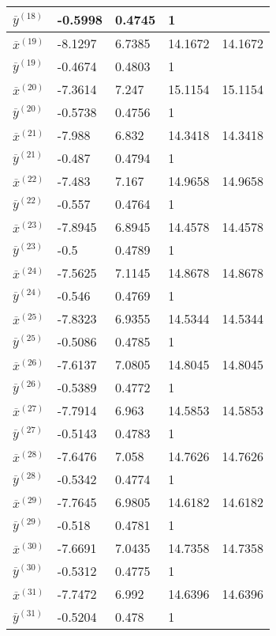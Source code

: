 \documentclass[10pt, a4paper]{scrartcl}
\begin{document}
\begin{center}
\begin{tabular}{ | l  | l  | l  | l  | l |}
$\overline{y}^{(18)}$ & -0.5998 & 0.4745 & 1 &   \\ \hline
$\overline{x}^{(19)}$ & -8.1297 & 6.7385 & 14.1672 & 14.1672 \\ \hline
$\overline{y}^{(19)}$ & -0.4674 & 0.4803 & 1 &   \\ \hline
$\overline{x}^{(20)}$ & -7.3614 & 7.247 & 15.1154 & 15.1154 \\ \hline
$\overline{y}^{(20)}$ & -0.5738 & 0.4756 & 1 &   \\ \hline
$\overline{x}^{(21)}$ & -7.988 & 6.832 & 14.3418 & 14.3418 \\ \hline
$\overline{y}^{(21)}$ & -0.487 & 0.4794 & 1 &   \\ \hline
$\overline{x}^{(22)}$ & -7.483 & 7.167 & 14.9658 & 14.9658 \\ \hline
$\overline{y}^{(22)}$ & -0.557 & 0.4764 & 1 &   \\ \hline
$\overline{x}^{(23)}$ & -7.8945 & 6.8945 & 14.4578 & 14.4578 \\ \hline
$\overline{y}^{(23)}$ & -0.5 & 0.4789 & 1 &   \\ \hline
$\overline{x}^{(24)}$ & -7.5625 & 7.1145 & 14.8678 & 14.8678 \\ \hline
$\overline{y}^{(24)}$ & -0.546 & 0.4769 & 1 &   \\ \hline
$\overline{x}^{(25)}$ & -7.8323 & 6.9355 & 14.5344 & 14.5344 \\ \hline
$\overline{y}^{(25)}$ & -0.5086 & 0.4785 & 1 &   \\ \hline
$\overline{x}^{(26)}$ & -7.6137 & 7.0805 & 14.8045 & 14.8045 \\ \hline
$\overline{y}^{(26)}$ & -0.5389 & 0.4772 & 1 &   \\ \hline
$\overline{x}^{(27)}$ & -7.7914 & 6.963 & 14.5853 & 14.5853 \\ \hline
$\overline{y}^{(27)}$ & -0.5143 & 0.4783 & 1 &   \\ \hline
$\overline{x}^{(28)}$ & -7.6476 & 7.058 & 14.7626 & 14.7626 \\ \hline
$\overline{y}^{(28)}$ & -0.5342 & 0.4774 & 1 &   \\ \hline
$\overline{x}^{(29)}$ & -7.7645 & 6.9805 & 14.6182 & 14.6182 \\ \hline
$\overline{y}^{(29)}$ & -0.518 & 0.4781 & 1 &   \\ \hline
$\overline{x}^{(30)}$ & -7.6691 & 7.0435 & 14.7358 & 14.7358 \\ \hline
$\overline{y}^{(30)}$ & -0.5312 & 0.4775 & 1 &   \\ \hline
$\overline{x}^{(31)}$ & -7.7472 & 6.992 & 14.6396 & 14.6396 \\ \hline
$\overline{y}^{(31)}$ & -0.5204 & 0.478 & 1 &   \\ \hline
\end{tabular}
\end{center}
\end{document}

